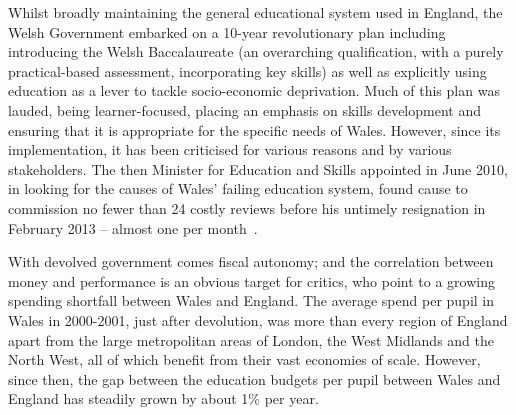 \documentclass[conference]{IEEEtran}
\begin{document}


Whilst broadly maintaining the general educational system
used in England, the Welsh
Government embarked on a 10-year revolutionary plan including
introducing the Welsh
Baccalaureate %
(an overarching qualification, with a purely practical-based
assessment, incorporating key skills) as well as explicitly
using education as a lever to tackle socio-economic deprivation.
Much of this plan was lauded, being learner-focused, placing an
emphasis on skills development and ensuring that it is appropriate for
the specific needs of Wales. However, since its implementation, it has
been criticised for various reasons and by various stakeholders.  The
then Minister for Education and Skills appointed in June 2010, in
looking for the causes of Wales' failing education system, found cause
to commission no fewer than 24 costly reviews before his untimely
resignation in February 2013 -- almost one per
month~\cite{Evans:2015}.

With devolved government comes fiscal autonomy; and the
correlation between money and performance is an obvious target for
critics, who point to a growing spending shortfall between Wales and
England.  The average spend per pupil in Wales in 2000-2001, just
after devolution, was more than every region of England apart from
the large metropolitan areas of London, the West Midlands and the
North West, all of which benefit from their vast economies of scale.
However, since then, the gap between the education budgets per pupil
between Wales and England has steadily grown by about 1\% per year.
\end{document}
